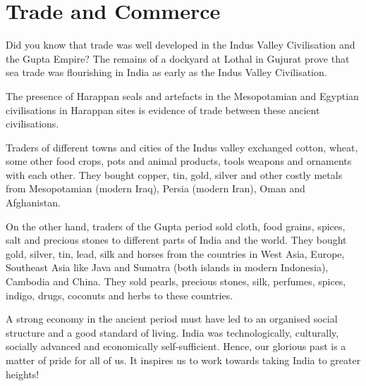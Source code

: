 \section{Trade and Commerce}
Did you know that trade was well developed in the Indus Valley Civilisation and the Gupta Empire? The remains of a dockyard at Lothal in Gujurat prove that sea trade was flourishing in India as early as the Indus Valley Civilisation.
\vspace{0.1in}
\par
The presence of Harappan seals and artefacts in the Mesopotamian and Egyptian civilisations in Harappan sites is evidence of trade between these ancient civilisations.
\vspace{0.1in}
\par
Traders of different towns and cities of the Indus valley exchanged cotton, wheat, some other food crops, pots and animal products, tools weapons and ornaments with each other. They bought copper, tin, gold, silver and other costly metals from Mesopotamian (modern Iraq), Persia (modern Iran), Oman and Afghanistan.
\vspace{0.5in}
\par
On the other hand, traders of the Gupta period sold cloth, food grains, spices, salt and precious stones to different parts of India and the world. They bought gold, silver, tin, lead, silk and horses from the countries in West Asia, Europe, Southeast Asia like Java and Sumatra (both islands in modern Indonesia), Cambodia and China. They sold pearls, precious stones, silk, perfumes, spices, indigo, drugs, coconuts and herbs to these countries.
\vspace{0.1in}
\par
A strong economy in the ancient period must have led to an organised social structure and a good standard of living. India was technologically, culturally, socially advanced and economically self-sufficient. Hence, our glorious past is a matter of pride for all of us. It inspires us to work towards taking India to greater heights!
\vspace{2in}
